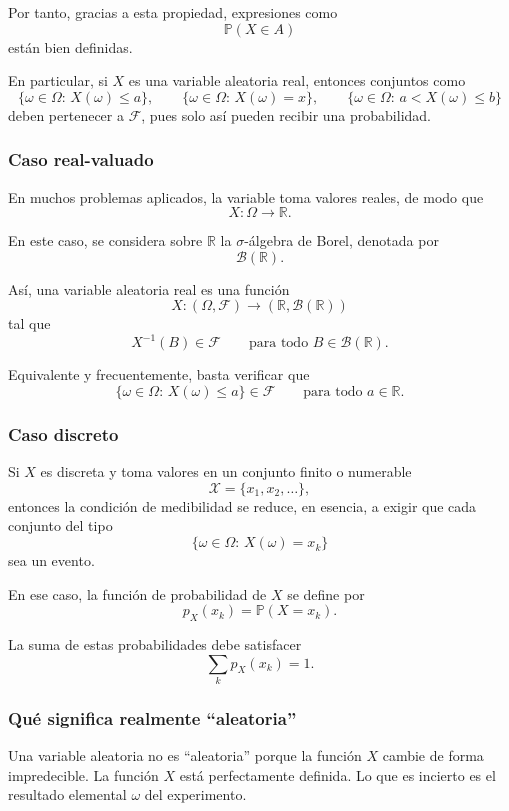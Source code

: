 \documentclass{article}
\begin{document}
Por tanto, gracias a esta propiedad, expresiones como
\[
\mathbb{P}(X\in A)
\]
están bien definidas.

En particular, si \(X\) es una variable aleatoria real, entonces conjuntos como
\[
\{\omega\in\Omega:\, X(\omega)\leq a\},
\qquad
\{\omega\in\Omega:\, X(\omega)=x\},
\qquad
\{\omega\in\Omega:\, a<X(\omega)\leq b\}
\]
deben pertenecer a \(\mathcal{F}\), pues solo así pueden recibir una probabilidad.

\subsubsection*{Caso real-valuado}

En muchos problemas aplicados, la variable toma valores reales, de modo que
\[
X:\Omega \to \mathbb{R}.
\]

En este caso, se considera sobre \(\mathbb{R}\) la \(\sigma\)-álgebra de Borel, denotada por
\[
\mathcal{B}(\mathbb{R}).
\]

Así, una variable aleatoria real es una función
\[
X:(\Omega,\mathcal{F})\to (\mathbb{R},\mathcal{B}(\mathbb{R}))
\]
tal que
\[
X^{-1}(B)\in\mathcal{F}
\qquad
\text{para todo } B\in\mathcal{B}(\mathbb{R}).
\]

Equivalente y frecuentemente, basta verificar que
\[
\{\omega\in\Omega:\, X(\omega)\leq a\}\in\mathcal{F}
\qquad
\text{para todo } a\in\mathbb{R}.
\]

\subsubsection*{Caso discreto}

Si \(X\) es discreta y toma valores en un conjunto finito o numerable
\[
\mathcal{X}=\{x_1,x_2,\dots\},
\]
entonces la condición de medibilidad se reduce, en esencia, a exigir que cada conjunto del tipo
\[
\{\omega\in\Omega:\, X(\omega)=x_k\}
\]
sea un evento.

En ese caso, la función de probabilidad de \(X\) se define por
\[
p_X(x_k)=\mathbb{P}(X=x_k).
\]

La suma de estas probabilidades debe satisfacer
\[
\sum_k p_X(x_k)=1.
\]

\subsubsection*{Qué significa realmente ``aleatoria''}

Una variable aleatoria no es ``aleatoria'' porque la función \(X\) cambie de forma impredecible. La función \(X\) está perfectamente definida. Lo que es incierto es el resultado elemental \(\omega\) del experimento.
\end{document}
